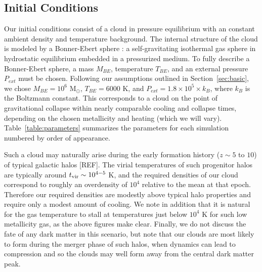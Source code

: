 \documentclass[useAMS,usenatbib]{mn2e}
\newcommand{\msun}{{M$_\odot$}}
\begin{document}

\subsection{Initial Conditions}

Our initial conditions consist of a cloud in pressure equilibrium with an
constant ambient density and temperature background. The internal structure of the
cloud is modeled by a Bonner-Ebert sphere \cite{Bonnor1956}: a self-gravitating
isothermal gas sphere in hydrostatic equilibrium embedded in a pressurized  
medium. To fully describe a Bonner-Ebert sphere, a mass $M_{BE}$, temperature
$T_{BE}$, and an external pressure $P_{ext}$ must be chosen. Following our
assumptions outlined in Section~\ref{sec:basic}, we chose
$M_{BE}=10^6$ \msun, $T_{BE}=6000$ K, and $P_{ext}=1.8\times10^5\times k_B$, 
where $k_B$ is the Boltzmann constant. This corresponds to a cloud on the point of
gravitational collapse within nearly comparable cooling and collapse times,
depending on the chosen metallicity and heating (which we will vary). Table~\ref{table:parameters}
summarizes the parameters for each simulation numbered by order of appearance.

Such a cloud may naturally arise during the early formation history ($z \sim 5$ to $10$)
of typical galactic halos [REF].  The virial temperatures of such progenitor halos are
typically around $t_{\rm vir} \sim 10^{4-5}$ K, and the required densities of our cloud
correspond to roughly an overdensity of $10^4$ relative to the mean at that epoch.
Therefore our required densities are modestly above typical halo properties and require
only a modest amount of cooling.  We note in addition that it is natural for the gas
temperature to stall at temperatures just below $10^4$ K for such low metallicity gas,
as the above figures make clear.  Finally, we do not discuss the fate of any dark matter 
in this scenario, but note that our clouds are most likely to form during the merger
phase of such halos, when dynamics can lead to compression and so the clouds may well
form away from the central dark matter peak.
\end{document}
